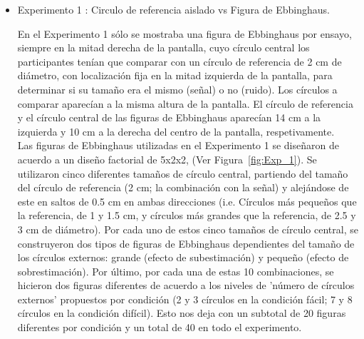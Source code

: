 \begin{itemize}
\item Experimento 1 : Circulo de referencia aislado vs Figura de Ebbinghaus.

En el Experimento 1 sólo se mostraba una figura de Ebbinghaus por ensayo, siempre en la mitad derecha de la pantalla, cuyo círculo central los participantes tenían que comparar con un círculo de referencia de 2 cm de diámetro, con localización fija en la mitad izquierda de la pantalla, para determinar si su tamaño era el mismo (señal) o no (ruido). Los círculos a comparar aparecían a la misma altura de la pantalla. El círculo de referencia y el círculo central de las figuras de Ebbinghaus aparecían 14 cm a la izquierda y 10 cm a la derecha del centro de la pantalla, respetivamente.\\

Las figuras de Ebbinghaus utilizadas en el Experimento 1 se diseñaron de acuerdo a un diseño factorial de 5x2x2, (Ver Figura~\ref{fig:Exp_1}). Se utilizaron cinco diferentes tamaños de círculo central, partiendo del tamaño del círculo de referencia (2 cm; la combinación con la señal) y alejándose de este en saltos de 0.5 cm en ambas direcciones (i.e. Círculos más pequeños que la referencia, de 1 y 1.5 cm, y círculos más grandes que la referencia, de 2.5 y 3 cm de diámetro). Por cada uno de estos cinco tamaños de círculo central, se construyeron dos tipos de figuras de Ebbinghaus dependientes del tamaño de los círculos externos: grande (efecto de subestimación) y pequeño (efecto de sobrestimación). Por último, por cada una de estas 10 combinaciones, se hicieron dos figuras diferentes de acuerdo a los niveles de 'número de círculos externos' propuestos por condición (2 y 3 círculos en la condición fácil; 7 y 8 círculos en la condición difícil). Esto nos deja con un subtotal de 20 figuras diferentes por condición y un total de 40 en todo el experimento.\\
 

\end{itemize}
